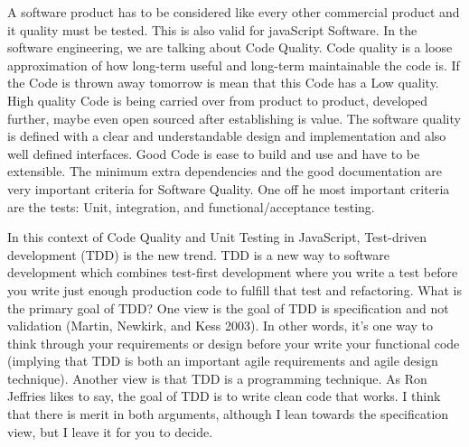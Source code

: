 \documentclass[11pt]{article}
\begin{document}
A software product has to be considered like every other commercial product and it quality must be tested. This is also valid for javaScript Software. In the software engineering, we are talking about Code Quality. Code quality is a loose approximation of how long-term useful and long-term maintainable the code is. If the Code is thrown away tomorrow is mean that this Code has a Low quality. High quality Code is being carried over from product to product, developed further, maybe even open sourced after establishing is value. The software quality is defined with a clear and understandable design and implementation and also well defined interfaces. Good Code is ease to build and use and have to be extensible. The minimum extra dependencies and the good documentation are very important criteria for Software Quality. One off he most important criteria are the tests: Unit, integration, and functional/acceptance testing.

In this context of Code Quality and Unit Testing in JavaScript, Test-driven development (TDD) is the new trend. TDD is a new way to software development which combines test-first development where you write a test before you write just enough production code to fulfill that test and refactoring. What is the primary goal of TDD? One view is the goal of TDD is specification and not validation (Martin, Newkirk, and Kess 2003). In other words, it’s one way to think through your requirements or design before your write your functional code (implying that TDD is both an important agile requirements and agile design technique). Another view is that TDD is a programming technique. As Ron Jeffries likes to say, the goal of TDD is to write clean code that works. I think that there is merit in both arguments, although I lean towards the specification view, but I leave it for you to decide. 
\end{document}
